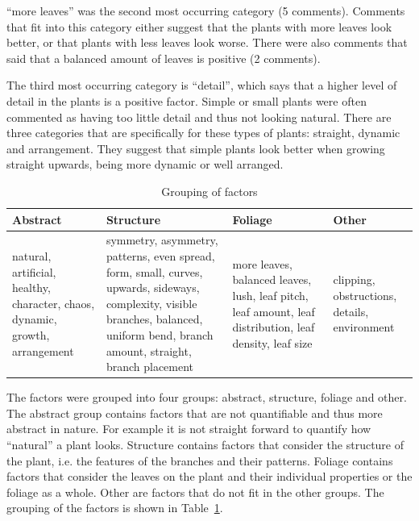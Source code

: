 ``more leaves'' was the second most occurring category (5 comments).
Comments that fit into this category either suggest that the plants with more leaves look better, or that plants with less leaves look worse.
There were also comments that said that a balanced amount of leaves is positive (2 comments).

The third most occurring category is ``detail'', which says that a higher level of detail in the plants is a positive factor.
Simple or small plants were often commented as having too little detail and thus not looking natural.
There are three categories that are specifically for these types of plants: straight, dynamic and arrangement.
They suggest that simple plants look better when growing straight upwards, being more dynamic or well arranged.

\begin{table}
    \centering
    \begin{tabularx}{\textwidth}{| X | X | X | X |}
    \hline
    Abstract & Structure & Foliage & Other \\
    \hline
    natural, artificial, healthy, character, chaos, dynamic, growth, arrangement &
    symmetry, asymmetry, patterns, even spread, form, small, curves, upwards, sideways, complexity, visible branches, balanced, uniform bend, branch amount, straight, branch placement &
    more leaves, balanced leaves, lush, leaf pitch, leaf amount, leaf distribution, leaf density, leaf size &
    clipping, obstructions, details, environment \\
    \hline
    \end{tabularx}
    \caption{Grouping of factors}
    \label{tab:factor-groups}
\end{table}

The factors were grouped into four groups: abstract, structure, foliage and other.
The abstract group contains factors that are not quantifiable and thus more abstract in nature.
For example it is not straight forward to quantify how ``natural'' a plant looks.
Structure contains factors that consider the structure of the plant, i.e. the features of the branches and their patterns.
Foliage contains factors that consider the leaves on the plant and their individual properties or the foliage as a whole.
Other are factors that do not fit in the other groups.
The grouping of the factors is shown in Table~\ref{tab:factor-groups}.


